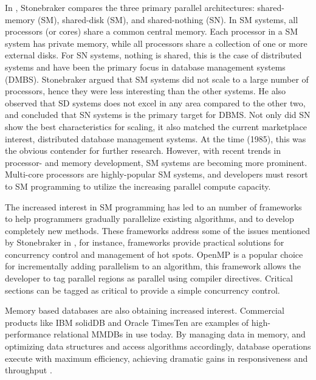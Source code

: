 \documentclass[12pt,a4paper,twoside]{report}
\begin{document}
In \cite{stonebraker1986case}, Stonebraker compares the three primary
parallel architectures: shared-memory (SM), shared-disk (SM), and
shared-nothing (SN). In SM systems, all processors (or cores) share a
common central memory. Each processor in a SM system has private
memory, while all processors share a collection of one or more
external disks. For SN systems, nothing is shared, this is the case of
distributed systems and have been the primary focus in database
management systems (DMBS). Stonebraker argued that SM systems did not
scale to a large number of processors, hence they were less
interesting than the other systems. He also observed that SD systems
does not excel in any area compared to the other two, and concluded
that SN systems is the primary target for DBMS. Not only did SN show
the best characteristics for scaling, it also matched the current
marketplace interest, distributed database management systems. At the
time (1985), this was the obvious contender for further research.
However, with recent trends in processor- and memory development, SM
systems are becoming more prominent. Multi-core processors are
highly-popular SM systems, and developers must resort to SM
programming to utilize the increasing parallel compute capacity.

The increased interest in SM programming has led to an number of
frameworks \cite{membarth2011frameworks} to help programmers gradually
parallelize existing algorithms, and to develop completely new
methods. These frameworks address some of the issues mentioned by
Stonebraker in \cite{stonebraker1986case}, for instance, frameworks
provide practical solutions for concurrency control and management of
hot spots. OpenMP is a popular choice for incrementally adding
parallelism to an algorithm, this framework allows the developer to
tag parallel regions as parallel using compiler directives. Critical
sections can be tagged as critical to provide a simple concurrency
control.

Memory based databases are also obtaining increased interest.
Commercial products like IBM solidDB and Oracle TimesTen are examples
of high-performance relational MMDBs in use today. By managing data in
memory, and optimizing data structures and access algorithms
accordingly, database operations execute with maximum efficiency,
achieving dramatic gains in responsiveness and throughput
\cite{oracle2012timesten}.
 
\end{document}
